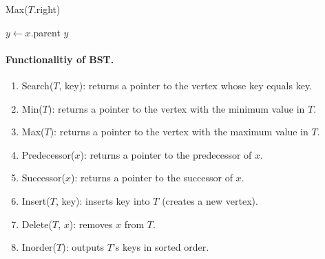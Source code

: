 %
\begin{algorithm}
\SetAlgoLined
{}
\caption{Inorder($T$)}
\end{algorithm}

\begin{algorithm}
\SetAlgoLined
{}
    \Return Max($T$.right)\;
    \caption{ Max }
\end{algorithm}



\begin{algorithm}
\SetAlgoLined
{}
    $y \leftarrow x$.parent\;
    \Return $y$\;
\caption{Successor}
\end{algorithm}




\paragraph{Functionalitiy of BST.}
\begin{enumerate}
\item Search($T$, key): returns a pointer to the vertex whose key equals key. 
  \item Min($T$): returns a pointer to the vertex with the minimum value in $T$.  
  \item Max($T$): returns a pointer to the vertex with the maximum value in $T$.  
  \item Predecessor($x$): returns a pointer to the predecessor of $x$.  
  \item Successor($x$): returns a pointer to the successor of $x$. 
  \item Insert($T$, key): inserts key into $T$ (creates a new vertex).   
  \item Delete($T$, $x$): removes $x$ from $T$. 
  \item Inorder($T$): outputs $T$'s keys in sorted order.

\end{enumerate}
